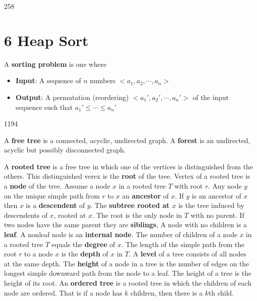 258\documentclass[11pt]{article}
\begin{document}

\section*{6 Heap Sort}

\begin{defn*}
  A \textbf{sorting problem} is one where
  \begin{itemize}
    \item \textbf{Input}: A sequence of $n$ numbers $<a_1, a_2, \cdots, a_n>$
    \item \textbf{Output}: A permutation (reordering) $<a_1', a_2',\cdots, a_n'>$ of the input sequence such that $a_1' \leq \cdots \leq a_n'$
  \end{itemize}
\end{defn*}


1194

\begin{defn*}
  A \textbf{free tree} is a connected, acyclic, undirected graph. A \textbf{forest} is an undirected, acyclic but possibly disconnected graph.
\end{defn*}

\begin{defn*}
  A \textbf{rooted tree} is a free tree in which one of the vertices is distinguished from the others. This distinguished verex is the \textbf{root} of the tree. Vertex of a rooted tree is a \textbf{node} of the tree. Assume a node $x$ in a rooted tree $T$ with root $r$. Any node $y$ on the unique simple path from $r$ to $x$ an \textbf{ancestor} of $x$. If $y$ is an ancestor of $x$ then $x$ is a \textbf{descendent} of $y$. The \textbf{subtree rooted at $x$} is the tree induced by descendents of $x$, rooted at $x$. The root is the only node in $T$ with no parent. If two nodes have the same parent they are \textbf{siblings}, A node with no children is a \textbf{leaf}. A nonleaf node is an \textbf{internal node}. The number of children of a node $x$ in a rooted tree $T$ equals the \textbf{degree} of $x$. The length of the simple path from the root $r$ to a node $x$ is the \textbf{depth} of $x$ in $T$. A \textbf{level} of a tree consists of all nodes at the same depth. The \textbf{height} of a node in a tree is the number of edges on the longest simple downward path from the node to a leaf. The height of a tree is the height of its root. An \textbf{ordered tree} is a rooted tree in which the children of each node are ordered. That is if a node has $k$ children, then there is a $k$th child.
\end{defn*}
\end{document}
